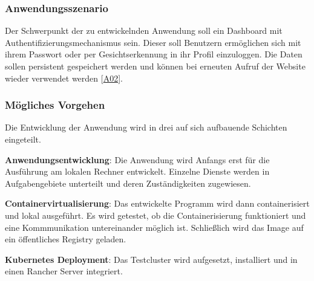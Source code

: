 \subsubsection{Anwendungsszenario}

Der Schwerpunkt der zu entwickelnden Anwendung soll ein Dashboard mit Authentifizierungsmechanismus sein. 
Dieser soll Benutzern ermöglichen sich mit ihrem Passwort oder per Gesichtserkennung in ihr Profil einzuloggen. 
Die Daten sollen persistent gespeichert werden und können bei erneuten Aufruf der Website wieder verwendet werden [\hyperlink{A02}{A02}]. 

\subsubsection{Mögliches Vorgehen}

Die Entwicklung der Anwendung wird in drei auf sich aufbauende Schichten eingeteilt.

\textbf{Anwendungsentwicklung}: 
Die Anwendung wird Anfangs erst für die Ausführung am lokalen Rechner entwickelt.
Einzelne Dienste werden in Aufgabengebiete unterteilt und deren Zuständigkeiten zugewiesen.

\textbf{Containervirtualisierung}: 
Das entwickelte Programm wird dann containerisiert und lokal ausgeführt.
Es wird getestet, ob die Containerisierung funktioniert und eine Kommmunikation
untereinander möglich ist. Schließlich wird das Image auf ein öffentliches Registry geladen.

\textbf{Kubernetes Deployment}: 
Das Testcluster wird aufgesetzt, installiert und in einen Rancher Server integriert.




